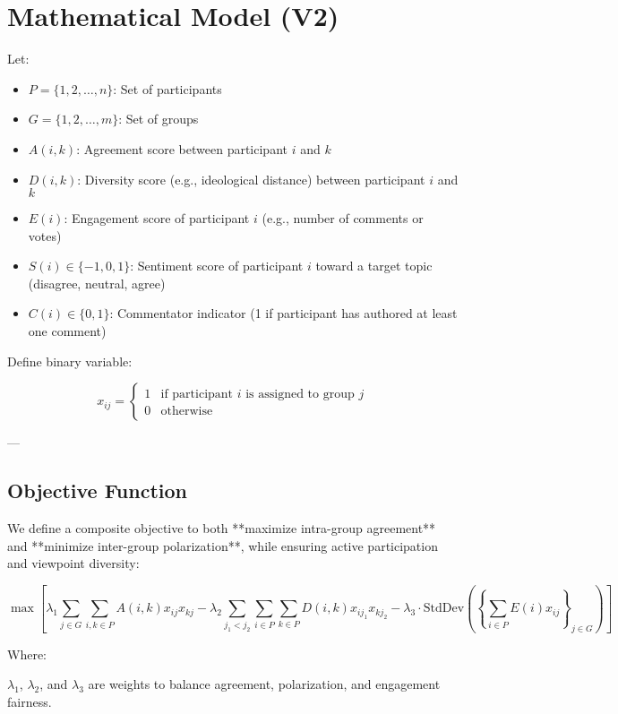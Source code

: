 \documentclass[11pt,a4paper]{article}
\begin{document}
\section{Mathematical Model (V2)}

\label{sec-model}

Let:
\begin{itemize}
\item $P = \{1, 2, \dots, n\}$: Set of participants
\item $G = \{1, 2, \dots, m\}$: Set of groups
\item $A(i,k)$: Agreement score between participant $i$ and $k$
\item $D(i,k)$: Diversity score (e.g., ideological distance) between participant $i$ and $k$
\item $E(i)$: Engagement score of participant $i$ (e.g., number of comments or votes)
\item $S(i) \in \{-1, 0, 1\}$: Sentiment score of participant $i$ toward a target topic (disagree, neutral, agree)
\item $C(i) \in \{0,1\}$: Commentator indicator (1 if participant has authored at least one comment)
\end{itemize}

Define binary variable:

$$
x_{ij} = \begin{cases}
1 & \text{if participant } i \text{ is assigned to group } j \\
0 & \text{otherwise}
\end{cases}
$$

---

\subsection{Objective Function}

We define a composite objective to both **maximize intra-group agreement** and **minimize inter-group polarization**, while ensuring active participation and viewpoint diversity:

$$
\max \left[
\lambda_1 \sum_{j \in G} \sum_{i,k \in P} A(i,k) x_{ij} x_{kj}
- \lambda_2 \sum_{j_1 < j_2} \sum_{i \in P} \sum_{k \in P} D(i,k) x_{ij_1} x_{kj_2}
- \lambda_3 \cdot \text{StdDev}\left( \left\{ \sum_{i \in P} E(i) x_{ij} \right\}_{j \in G} \right)
\right]
$$

Where:

$\lambda_1$, $\lambda_2$, and $\lambda_3$ are weights to balance agreement, polarization, and engagement fairness.
\end{document}

